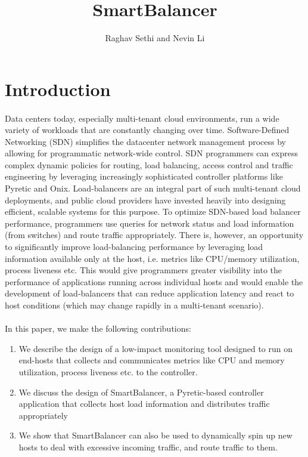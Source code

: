 \documentclass[10pt]{article}
\begin{document}
\title{SmartBalancer}
\author{Raghav Sethi and Nevin Li}
\date{}
\maketitle

\section{Introduction}

\paragraph{} Data centers today, especially multi-tenant cloud environments, run a wide variety of workloads that are constantly changing over time. Software-Defined Networking (SDN) simplifies the datacenter network management process by allowing for programmatic network-wide control. SDN programmers can express complex dynamic policies for routing, load balancing, access control and traffic engineering by leveraging increasingly sophisticated controller platforms like Pyretic\cite{Pyretic} and Onix\cite{Onix}. Load-balancers are an integral part of such multi-tenant cloud deployments, and public cloud providers have invested heavily into designing efficient, scalable systems for this purpose\cite{Ananta}. To optimize SDN-based load balancer performance, programmers use queries for network status and load information (from switches) and route traffic appropriately. There is, however, an opportunity to significantly improve load-balancing performance by leveraging load information available only at the host, i.e. metrics like CPU/memory utilization, process liveness etc. This would give programmers greater visibility into the performance of applications running across individual hosts and would enable the development of load-balancers that can reduce application latency and react to host conditions (which may change rapidly in a multi-tenant scenario).

\paragraph{} In this paper, we make the following contributions:
\begin{enumerate}
\item We describe the design of a low-impact monitoring tool designed to run on end-hosts that collects and communicates metrics like CPU and memory utilization, process liveness etc. to the controller.
\item We discuss the design of SmartBalancer, a Pyretic-based controller application that collects host load information and distributes traffic appropriately
\item We show that SmartBalancer can also be used to dynamically spin up new hosts to deal with excessive incoming traffic, and route traffic to them.
\end{enumerate}
\end{document}
